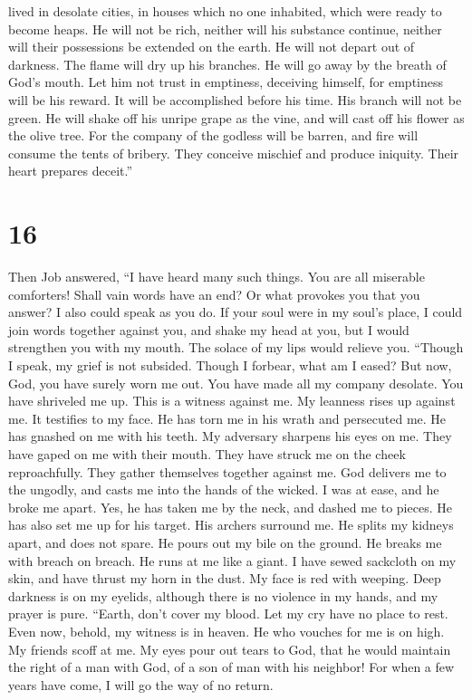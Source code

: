 lived in desolate cities, in houses which no one inhabited, which were
ready to become heaps.  He will not be rich, neither will
his substance continue, neither will their possessions be extended on
the earth.  He will not depart out of darkness. The flame
will dry up his branches. He will go away by the breath of God's mouth.
 Let him not trust in emptiness, deceiving himself, for
emptiness will be his reward.  It will be accomplished
before his time. His branch will not be green.  He will
shake off his unripe grape as the vine, and will cast off his flower as
the olive tree.  For the company of the godless will be
barren, and fire will consume the tents of bribery.  They
conceive mischief and produce iniquity. Their heart prepares deceit.''

\hypertarget{section-15}{%
\section{16}\label{section-15}}

 Then Job answered,  ``I have heard many
such things. You are all miserable comforters!  Shall vain
words have an end? Or what provokes you that you answer? 
I also could speak as you do. If your soul were in my soul's place, I
could join words together against you, and shake my head at you,
 but I would strengthen you with my mouth. The solace of
my lips would relieve you.  ``Though I speak, my grief is
not subsided. Though I forbear, what am I eased?  But now,
God, you have surely worn me out. You have made all my company desolate.
 You have shriveled me up. This is a witness against me.
My leanness rises up against me. It testifies to my face. 
He has torn me in his wrath and persecuted me. He has gnashed on me with
his teeth. My adversary sharpens his eyes on me.  They
have gaped on me with their mouth. They have struck me on the cheek
reproachfully. They gather themselves together against me.
 God delivers me to the ungodly, and casts me into the
hands of the wicked.  I was at ease, and he broke me
apart. Yes, he has taken me by the neck, and dashed me to pieces. He has
also set me up for his target.  His archers surround me.
He splits my kidneys apart, and does not spare. He pours out my bile on
the ground.  He breaks me with breach on breach. He runs
at me like a giant.  I have sewed sackcloth on my skin,
and have thrust my horn in the dust.  My face is red with
weeping. Deep darkness is on my eyelids,  although there
is no violence in my hands, and my prayer is pure. 
``Earth, don't cover my blood. Let my cry have no place to rest.
 Even now, behold, my witness is in heaven. He who
vouches for me is on high.  My friends scoff at me. My
eyes pour out tears to God,  that he would maintain the
right of a man with God, of a son of man with his neighbor!
 For when a few years have come, I will go the way of no
return.

